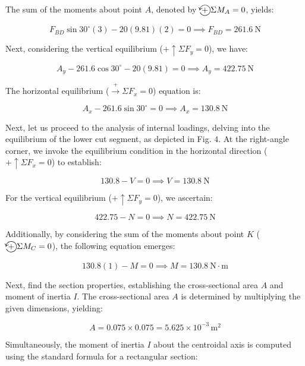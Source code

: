 \documentclass[12pt]{article}
\begin{document}
\begin{figure}[!ht]
    \centering
    
    \caption{}
\end{figure}

The sum of the moments about point \(A\), denoted by \(\CircArrowLeft{+} \Sigma M_A = 0\), yields:

\[
F_{BD} \sin 30^{\circ}(3) - 20(9.81)(2) = 0 \implies F_{BD} = 261.6 \mathrm{~N}
\]

Next, considering the vertical equilibrium (\(+\uparrow \Sigma F_y = 0\)), we have:

\[
A_y - 261.6 \cos 30^{\circ} - 20(9.81) = 0 \implies A_y = 422.75 \mathrm{~N}
\]

The horizontal equilibrium (\(\stackrel{+}{\rightarrow} \Sigma F_x = 0\)) equation is:

\[
A_x - 261.6 \sin 30^{\circ} = 0 \implies A_x = 130.8 \mathrm{~N}
\]

Next, let us proceed to the analysis of internal loadings, delving into the equilibrium of the lower cut segment, as depicted in Fig. \(4\). At the right-angle corner, we invoke the equilibrium condition in the horizontal direction (\(+\uparrow \Sigma F_x = 0\)) to establish:

\[
130.8 - V = 0 \implies V = 130.8 \mathrm{~N}
\]

For the vertical equilibrium (\(+\uparrow \Sigma F_y = 0\)), we ascertain:

\[
422.75 - N = 0 \implies N = 422.75 \mathrm{~N}
\]

Additionally, by considering the sum of the moments about point \(K\) (\(\CircArrowLeft{+}\Sigma M_C = 0\)), the following equation emerges:

\[
130.8(1) - M = 0 \implies M = 130.8 \mathrm{~N \cdot m}
\]

\begin{figure}[!ht]
    \centering
    
    \caption{}
\end{figure}

Next, find the section properties, establishing the cross-sectional area \(A\) and moment of inertia \(I\). The cross-sectional area \(A\) is determined by multiplying the given dimensions, yielding:

\[
A = 0.075 \times 0.075 = 5.625 \times 10^{-3} \, \mathrm{m}^2
\]

Simultaneously, the moment of inertia \(I\) about the centroidal axis is computed using the standard formula for a rectangular section:
\end{document}
